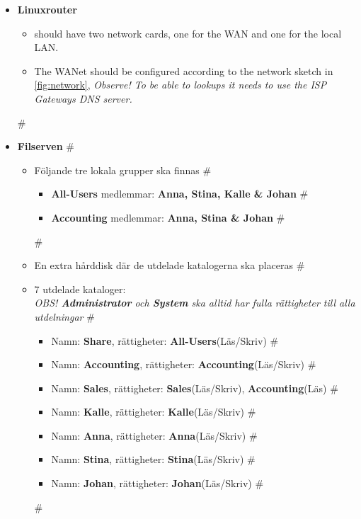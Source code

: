 \documentclass[paper=a4, fontsize=11pt]{report} %
\begin{document}
\begin{itemize}
\begin{itemize}
        \item \textbf{Linuxrouter}
        \begin{itemize}
			\item should have two network cards, one for the WAN and one for the local LAN.
            \item The WANet should be configured according to the network sketch in \figurename \ref{fig:network}, \textit{Observe! To be able to lookups it needs to use the ISP Gateways DNS server.}
			
        \end{itemize}

        #\item \textbf{Filserven}
        #\begin{itemize}
        #    \item Följande tre lokala grupper ska finnas
        #    \begin{itemize}
        #        \item \textbf{All-Users} medlemmar: \textbf{Anna, Stina, Kalle \& Johan}
        #        \item \textbf{Accounting} medlemmar: \textbf{Anna, Stina \& Johan}
        #    \end{itemize}
        #    \item En extra hårddisk där de utdelade katalogerna ska placeras
        #    \item 7 utdelade kataloger: \\ \textit{OBS! \textbf{Administrator} och \textbf{System} ska alltid har fulla rättigheter till alla utdelningar}
        #    \begin{itemize}
        #        \item Namn: \textbf{Share}, rättigheter: \textbf{All-Users}(Läs/Skriv)
        #        \item Namn: \textbf{Accounting}, rättigheter: \textbf{Accounting}(Läs/Skriv)
        #        \item Namn: \textbf{Sales}, rättigheter: \textbf{Sales}(Läs/Skriv), \textbf{Accounting}(Läs)
        #        \item Namn: \textbf{Kalle}, rättigheter: \textbf{Kalle}(Läs/Skriv)
        #        \item Namn: \textbf{Anna}, rättigheter: \textbf{Anna}(Läs/Skriv)
        #        \item Namn: \textbf{Stina}, rättigheter: \textbf{Stina}(Läs/Skriv)
        #        \item Namn: \textbf{Johan}, rättigheter: \textbf{Johan}(Läs/Skriv)
        #    \end{itemize}
        #\end{itemize}
    \end{itemize}
\end{itemize}
\end{document}
